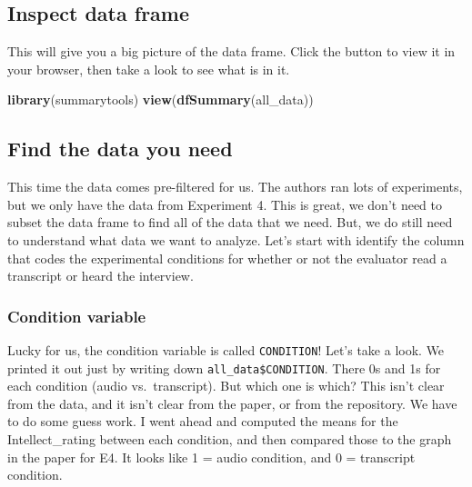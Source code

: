 \documentclass[]{book}
\newenvironment{Shaded}{\begin{snugshade}}{\end{snugshade}}
\newcommand{\KeywordTok}[1]{\textcolor[rgb]{0.13,0.29,0.53}{\textbf{{#1}}}}
\newcommand{\NormalTok}[1]{{#1}}
\theoremstyle{definition}
\theoremstyle{definition}
\theoremstyle{definition}
\theoremstyle{remark}
\begin{document}
\subsection{Inspect data frame}\label{inspect-data-frame}

This will give you a big picture of the data frame. Click the button to
view it in your browser, then take a look to see what is in it.

\begin{Shaded}
\begin{Highlighting}[]
\KeywordTok{library}\NormalTok{(summarytools)}
\KeywordTok{view}\NormalTok{(}\KeywordTok{dfSummary}\NormalTok{(all_data))}
\end{Highlighting}
\end{Shaded}

\subsection{Find the data you need}\label{find-the-data-you-need}

This time the data comes pre-filtered for us. The authors ran lots of
experiments, but we only have the data from Experiment 4. This is great,
we don't need to subset the data frame to find all of the data that we
need. But, we do still need to understand what data we want to analyze.
Let's start with identify the column that codes the experimental
conditions for whether or not the evaluator read a transcript or heard
the interview.

\subsubsection{Condition variable}\label{condition-variable}

Lucky for us, the condition variable is called \texttt{CONDITION}! Let's
take a look. We printed it out just by writing down
\texttt{all\_data\$CONDITION}. There 0s and 1s for each condition (audio
vs.~transcript). But which one is which? This isn't clear from the data,
and it isn't clear from the paper, or from the repository. We have to do
some guess work. I went ahead and computed the means for the
Intellect\_rating between each condition, and then compared those to the
graph in the paper for E4. It looks like 1 = audio condition, and 0 =
transcript condition.

\begin{Shaded}
\end{Shaded}
\end{document}
